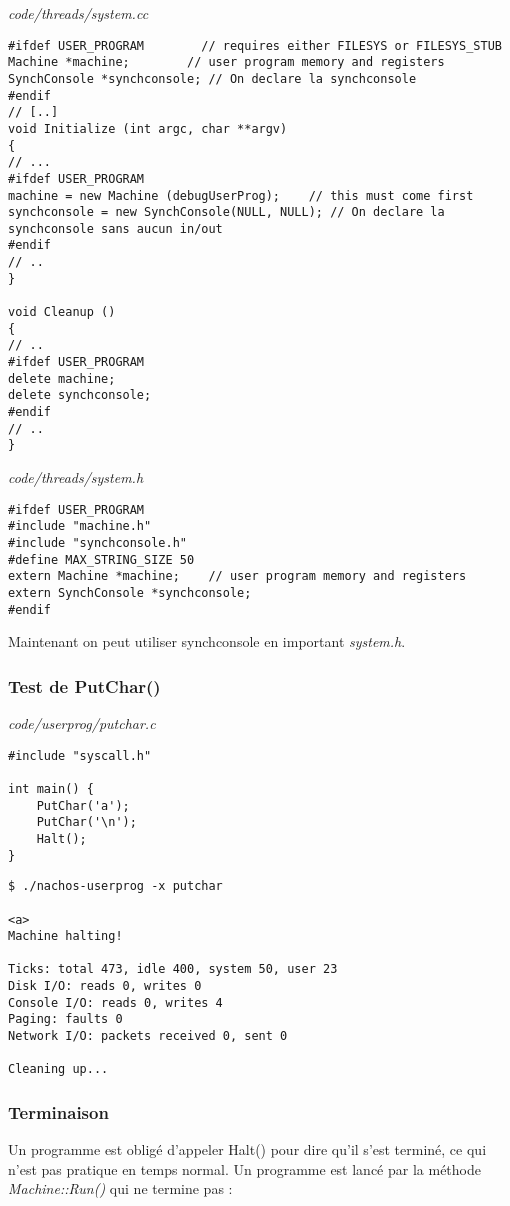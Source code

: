 \documentclass[a4paper,10pt]{article}
\begin{document}
\textit{code/threads/system.cc}

\begin{lstlisting}
#ifdef USER_PROGRAM        // requires either FILESYS or FILESYS_STUB
Machine *machine;        // user program memory and registers
SynchConsole *synchconsole; // On declare la synchconsole
#endif
// [..]
void Initialize (int argc, char **argv)
{
// ...
#ifdef USER_PROGRAM
machine = new Machine (debugUserProg);    // this must come first
synchconsole = new SynchConsole(NULL, NULL); // On declare la synchconsole sans aucun in/out
#endif
// ..
}

void Cleanup ()
{
// ..
#ifdef USER_PROGRAM
delete machine;
delete synchconsole;
#endif
// ..
}
\end{lstlisting}

\textit{code/threads/system.h}
\begin{lstlisting}
#ifdef USER_PROGRAM
#include "machine.h"
#include "synchconsole.h"
#define MAX_STRING_SIZE 50
extern Machine *machine;    // user program memory and registers
extern SynchConsole *synchconsole;
#endif
\end{lstlisting}

Maintenant on peut utiliser synchconsole en important \textit{system.h}.

\subsubsection{Test de PutChar()}

\textit{code/userprog/putchar.c}
\begin{lstlisting}
#include "syscall.h"

int main() {
    PutChar('a');
    PutChar('\n');
    Halt();
}
\end{lstlisting}

\begin{lstlisting}
$ ./nachos-userprog -x putchar

<a>
Machine halting!

Ticks: total 473, idle 400, system 50, user 23
Disk I/O: reads 0, writes 0
Console I/O: reads 0, writes 4
Paging: faults 0
Network I/O: packets received 0, sent 0

Cleaning up...

\end{lstlisting}

\subsubsection{Terminaison}
Un programme est obligé d'appeler Halt() pour dire qu'il s'est terminé, ce qui
n'est pas pratique en temps normal. Un programme est lancé par la méthode
\textit{Machine::Run()} qui ne termine pas :
\end{document}
